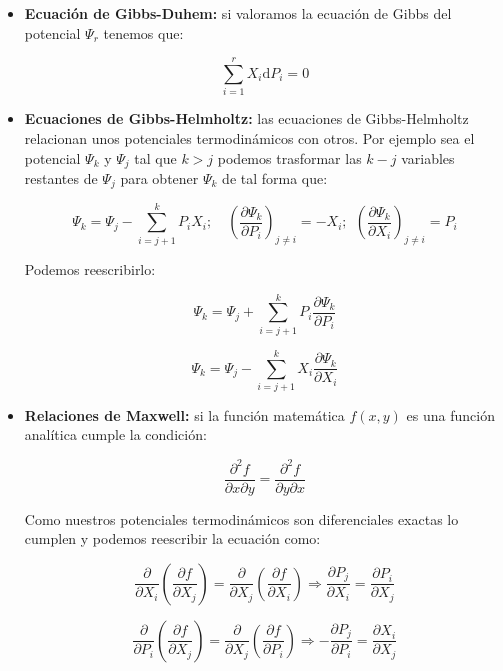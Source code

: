 \documentclass[12pt,a4paper]{article}
\newcommand{\D}{\mathrm{d}}
\newcommand{\parentesis}[1]{\left( #1 \right)}
\newcommand{\parciales}[2]{\frac{\partial #1}{\partial #2}}
\begin{document}
\begin{itemize}
\item \textbf{Ecuación de Gibbs-Duhem:} si valoramos la ecuación de Gibbs del potencial $\Psi_r$ tenemos que:

\begin{equation}
\sum_{i=1}^r X_i \D P_i = 0
\end{equation}


\item \textbf{Ecuaciones de Gibbs-Helmholtz:} las ecuaciones de Gibbs-Helmholtz relacionan unos potenciales termodinámicos con otros. Por ejemplo sea el potencial $\Psi_k$ y $\Psi_j$ tal que $k>j$ podemos trasformar las $k-j$ variables restantes  de $\Psi_j$ para obtener $\Psi_k$ de tal forma que:


\begin{equation}
\Psi_k = \Psi_j - \sum_{i=j+1}^k P_i X_i; \quad \parentesis{\parciales{\Psi_k}{P_i}}_{j\neq i} = - X_i; \ \  \parentesis{\parciales{\Psi_k}{X_i}}_{j\neq i} = P_i
\end{equation}

Podemos reescribirlo: 

\begin{equation}
\Psi_k = \Psi_j + \sum_{i=j+1}^k P_i \parciales{\Psi_k}{P_i}
\end{equation}


\begin{equation}
\Psi_k = \Psi_j - \sum_{i=j+1}^k X_i \parciales{\Psi_k}{X_i}
\end{equation}

\item \textbf{Relaciones de Maxwell:} si la función matemática $f(x,y)$ es una función analítica cumple la condición:

$$ \dfrac{\partial^2 f}{\partial x \partial y} = \dfrac{\partial^2 f}{\partial y \partial x} $$

Como nuestros potenciales termodinámicos son diferenciales exactas lo cumplen y podemos reescribir la ecuación como:

\begin{equation}
\parciales{}{X_i} \parentesis{\parciales{f}{X_j}} = \parciales{}{X_j} \parentesis{\parciales{f}{X_i}} \Longrightarrow   \parciales{P_j}{X_i} = \parciales{P_i}{X_j}
\end{equation}

\begin{equation}
\parciales{}{P_i} \parentesis{\parciales{f}{X_j}} = \parciales{}{X_j} \parentesis{\parciales{f}{P_i}} \Longrightarrow   - \parciales{P_j}{P_i} = \parciales{X_i}{X_j}
\end{equation}

\end{itemize}
\end{document}
